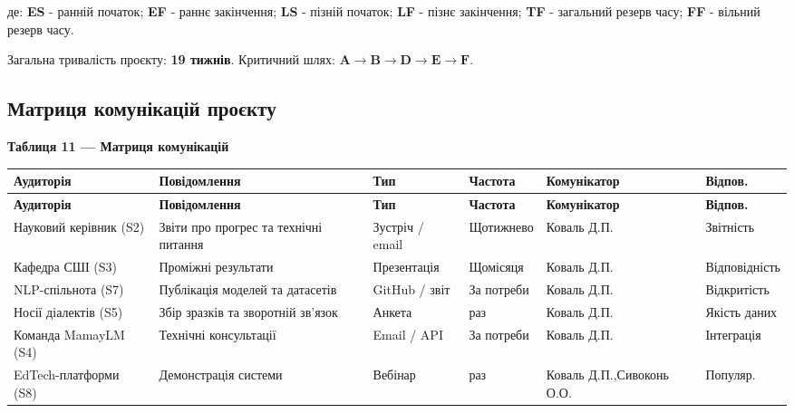 \documentclass[14pt]{extarticle}
\newcommand{\tabhead}[1]{\textbf{#1}}
\begin{document}
\noindent де: \textbf{ES} - ранній початок; \textbf{EF} - раннє закінчення; \textbf{LS} - пізній початок; \textbf{LF} - пізнє закінчення; \textbf{TF} - загальний резерв часу; \textbf{FF} - вільний резерв часу.

\medskip
\noindent Загальна тривалість проєкту: \textbf{19 тижнів}. Критичний шлях: $\mathbf{A \to B \to D \to E \to F}$.

\subsection{Матриця комунікацій проєкту}

\vspace{6pt}
\noindent\textbf{Таблиця 11 --- Матриця комунікацій}

\begin{longtable}{|>{\raggedright\arraybackslash}p{}|>{\raggedright\arraybackslash}p{}|>{\raggedright\arraybackslash}p{}|>{\raggedright\arraybackslash}p{}|>{\raggedright\arraybackslash}p{}|>{\raggedright\arraybackslash}p{}|}
\hline
\tabhead{Аудиторія} & \tabhead{Повідомлення} & \tabhead{Тип} & \tabhead{Частота} & \tabhead{Ко\-му\-ні\-ка\-тор} & \tabhead{Від\-пов.} \\
\hline
\endfirsthead
\hline
\tabhead{Аудиторія} & \tabhead{Повідомлення} & \tabhead{Тип} & \tabhead{Частота} & \tabhead{Ко\-му\-ні\-ка\-тор} & \tabhead{Від\-пов.} \\
\hline
\endhead
Нау\-ко\-вий керівник (S2) & Звіти про прогрес та технічні питання & Зустріч / email & Що\-тиж\-не\-во & Коваль Д.П. & Звіт\-ність \\
\hline
Ка\-фед\-ра СШІ (S3) & Проміжні результати & Презентація & Що\-мі\-ся\-ця & Коваль Д.П. & Від\-по\-від\-ність \\
\hline
NLP-спільнота (S7) & Публікація моделей та датасетів & GitHub / звіт & За потреби & Коваль Д.П. & Від\-кри\-тість \\
\hline
Носії діалектів (S5) & Збір зразків та зворотній зв'язок & Анкета & 1 раз & Коваль Д.П. & Якість даних \\
\hline
Команда MamayLM (S4) & Технічні консультації & Email / API & За потреби & Коваль Д.П. & Ін\-тег\-ра\-ція \\
\hline
EdTech-платформи (S8) & Демонстрація системи & Вебінар & 1 раз & Коваль Д.П.,\newline Сивоконь О.О. & Попу\-ляр. \\
\hline
\end{longtable}
\end{document}
